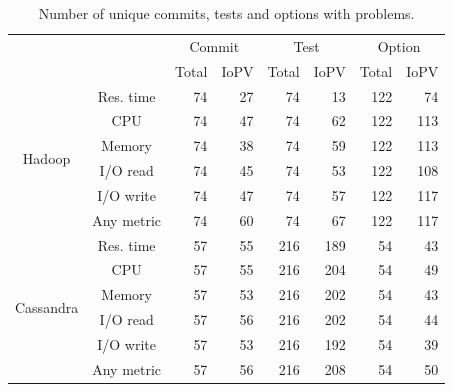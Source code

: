 \begin{table}[t]
    \centering
    \tabcolsep=0.15cm
    \caption{Number of unique commits, tests and options with \inconsistent problems.} %
    \begin{tabular}{|c|c|r|r|r|r|r|r|}
    \hline
    \multirow{2}{*}{}          & \multirow{2}{*}{} & \multicolumn{2}{c|}{Commit}      & \multicolumn{2}{c|}{Test}        & \multicolumn{2}{c|}{Option}      \\ \cline{3-8} 
         &                   & \multicolumn{1}{c|}{Total} & \multicolumn{1}{c|}{IoPV} & \multicolumn{1}{c|}{Total} & \multicolumn{1}{c|}{IoPV} & \multicolumn{1}{c|}{Total} & \multicolumn{1}{c|}{IoPV} \\ \hline
    \multirow{6}{*}{Hadoop}    & Res. time         & 74   & 27  & 74   & 13  & 122  & 74  \\ \cline{2-8} 
         & CPU               & 74   & 47  & 74   & 62  & 122  & 113 \\ \cline{2-8} 
         & Memory            & 74   & 38  & 74   & 59  & 122  & 113 \\ \cline{2-8} 
         & I/O read          & 74   & 45  & 74   & 53  & 122  & 108 \\ \cline{2-8} 
         & I/O write         & 74   & 47  & 74   & 57  & 122  & 117 \\ \cline{2-8} 
         & Any metric        & 74   & 60  & 74   & 67  & 122  & 117 \\ \hline
    \multirow{6}{*}{Cassandra} & Res. time         & 57   & 55  & 216  & 189 & 54   & 43  \\ \cline{2-8} 
         & CPU               & 57   & 55  & 216  & 204 & 54   & 49  \\ \cline{2-8} 
         & Memory            & 57   & 53  & 216  & 202 & 54   & 43  \\ \cline{2-8} 
         & I/O read          & 57   & 56  & 216  & 202 & 54   & 44  \\ \cline{2-8} 
         & I/O write         & 57   & 53  & 216  & 192 & 54   & 39  \\ \cline{2-8} 
         & Any metric        & 57   & 56  & 216  & 208 & 54   & 50  \\ \hline
    \end{tabular}
    \label{tab:dimemssion_regression}
\end{table}

